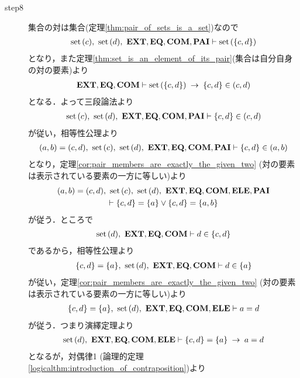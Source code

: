 \begin{sketch}
\begin{description}
			\item[step8] 集合の対は集合(定理\ref{thm:pair_of_sets_is_a_set})なので
				\begin{align}
					\operatorname*{set}\hspace{0.15em}(c),\ \operatorname*{set}\hspace{0.15em}(d),\ \mbox{{\bf EXT}},\mbox{{\bf EQ}},\mbox{\bf COM},\mbox{{\bf PAI}} \vdash \operatorname*{set}\hspace{0.15em}(\{c,d\})
				\end{align}
				となり，また定理\ref{thm:set_is_an_element_of_its_pair}(集合は自分自身の対の要素)より
				\begin{align}
					\mbox{{\bf EXT}},\mbox{{\bf EQ}},\mbox{\bf COM} \vdash \operatorname*{set}\hspace{0.15em}(\{c,d\}) \hspace{0.25em}\rightarrow\hspace{0.25em} \{c,d\} \in (c,d)	
				\end{align}
				となる．よって三段論法より
				\begin{align}
					\operatorname*{set}\hspace{0.15em}(c),\ \operatorname*{set}\hspace{0.15em}(d),\ \mbox{{\bf EXT}},\mbox{{\bf EQ}},\mbox{\bf COM},\mbox{{\bf PAI}} \vdash \{c,d\} \in (c,d)
				\end{align}
				が従い，相等性公理より
				\begin{align}
					(a,b) = (c,d),\ \set{c},\ \set{d},\ \EXTAX,\EQAX,\COMAX,\PAIAX \vdash \{c,d\} \in (a,b)
				\end{align}
				となり，定理\ref{cor:pair_members_are_exactly_the_given_two}
				(対の要素は表示されている要素の一方に等しい)より
				\begin{align}
					\begin{gathered}
						(a,b) = (c,d),\ \set{c},\ \set{d},\ \EXTAX,\EQAX,\COMAX,\ELEAX,\PAIAX \\
						\vdash \{c,d\} = \{a\} \vee \{c,d\} = \{a,b\}
					\end{gathered}
					\label{fom:equality_of_ordered_pairs_15}
				\end{align}
				が従う．ところで
				\begin{align}
					\operatorname*{set}\hspace{0.15em}(d),\ \mbox{{\bf EXT}},\mbox{{\bf EQ}},\mbox{\bf COM} \vdash d \in \{c,d\}
					\label{fom:equality_of_ordered_pairs_17}
				\end{align}
				であるから，相等性公理より
				\begin{align}
					\{c,d\} = \{a\},\ \operatorname*{set}\hspace{0.15em}(d),\ \mbox{{\bf EXT}},\mbox{{\bf EQ}},\mbox{\bf COM} \vdash d \in \{a\}
				\end{align}
				が従い，定理\ref{cor:pair_members_are_exactly_the_given_two} (対の要素は表示されている要素の一方に等しい)より
				\begin{align}
					\{c,d\} = \{a\},\ \set{d},\ \EXTAX,\EQAX,\COMAX,\ELEAX \vdash a = d
				\end{align}
				が従う．つまり演繹定理より
				\begin{align}
					\operatorname*{set}\hspace{0.15em}(d),\ \mbox{{\bf EXT}},\mbox{{\bf EQ}},\mbox{\bf COM},\mbox{{\bf ELE}} \vdash \{c,d\} = \{a\} \hspace{0.25em}\rightarrow\hspace{0.25em} a = d
				\end{align}
				となるが，対偶律1 (論理的定理\ref{logicalthm:introduction_of_contraposition})より

\end{description}
\end{sketch}
